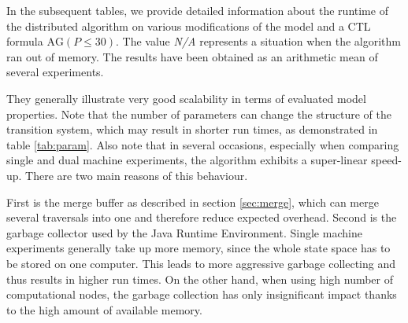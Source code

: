 \documentclass[12pt,oneside]{fithesis2}
\newcommand{\ag}[1]{\ensuremath{\mbox{AG} #1}}
\begin{document}
				In the subsequent tables, we provide detailed information about the runtime of the distributed algorithm on various modifications of the model and a CTL formula $\ag{(P \leq 30)}$.  The value {\em N/A} represents a situation when the algorithm ran out of memory. The results have been obtained as an arithmetic mean of several experiments.
				
				They generally illustrate very good scalability in terms of evaluated model properties. Note that the number of parameters can change the structure of the transition system, which may result in shorter run times, as demonstrated in table \ref{tab:param}. Also note that in several occasions, especially when comparing single and dual machine experiments, the algorithm exhibits a super-linear speed-up. There are two main reasons of this behaviour. 
				
				First is the merge buffer as described in section \ref{sec:merge}, which can merge several traversals into one and therefore reduce expected overhead. Second is the garbage collector used by the Java Runtime Environment. Single machine experiments generally take up more memory, since the whole state space has to be stored on one computer. This leads to more aggressive garbage collecting and thus results in higher run times. On the other hand, when using high number of computational nodes, the garbage collection has only insignificant impact thanks to the high amount of available memory.
				
\end{document}
